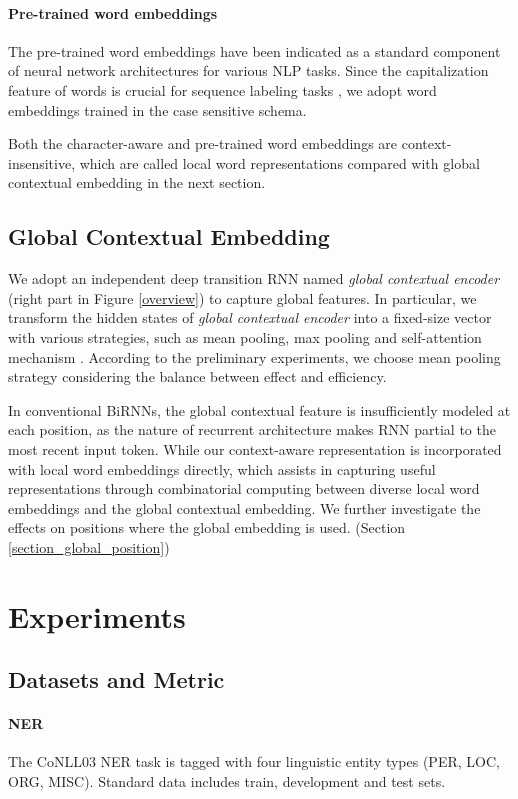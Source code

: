 \documentclass[11pt,a4paper]{article}
\begin{document}
\paragraph{Pre-trained word embeddings} 
The pre-trained word embeddings have been indicated as a standard component of neural network architectures for various NLP tasks. Since the capitalization feature of words is crucial for sequence labeling tasks \cite{collobert2011}, we adopt word embeddings trained in the case sensitive schema. 

Both the character-aware and pre-trained word embeddings are context-insensitive, which are called local word representations compared with global contextual embedding in the next section.

\subsection{Global Contextual Embedding}
We adopt an independent deep transition RNN named \emph{global contextual encoder} (right part in Figure \ref{overview}) to capture global features. In particular, we transform the hidden states of \emph{global contextual encoder} into a fixed-size vector with various strategies, such as mean pooling, max pooling and self-attention mechanism \cite{attention}. According to the preliminary experiments, we choose mean pooling strategy considering the balance between effect and efficiency.

In conventional BiRNNs, the global contextual feature is insufficiently modeled at each position, as the nature of recurrent architecture makes RNN partial to the most recent input token. While our context-aware representation is incorporated with local word embeddings directly, which assists in capturing useful representations through combinatorial computing between diverse local word embeddings and the global contextual embedding. We further investigate the effects on positions where the global embedding is used. (Section \ref{section_global_position})

\section{Experiments}

\subsection{Datasets and Metric}

\paragraph{NER}
The CoNLL03 NER task \cite{CoNLL2003} is tagged with four linguistic entity types (PER, LOC, ORG, MISC). Standard data includes train, development and test sets. 
\end{document}
